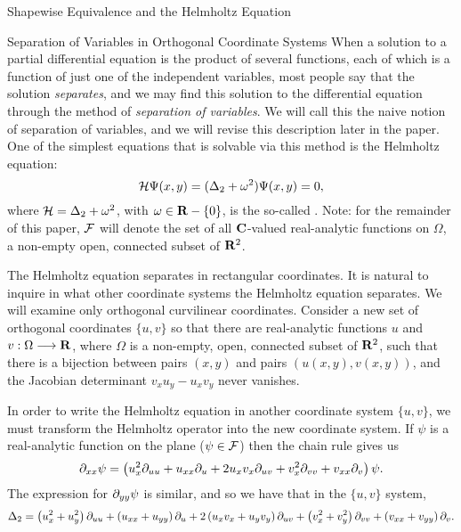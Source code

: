 \begin{center}
\LARGE Shapewise Equivalence and the Helmholtz Equation \

\end{center}

\normalsize

\begin{section}{Separation of Variables in Orthogonal Coordinate Systems}
When a solution to a partial differential equation is the product of several functions, each of which is a function of just one of the independent variables, most people say that the solution \emph{separates}, and we may find this solution to the differential equation through the method of \emph{separation of variables}.  We will call this the naive notion of separation of variables, and we will revise this description later in the paper.  One of the simplest equations that is solvable via this method is the Helmholtz equation:
\begin{equation}
\label{helmholtz}
\mathcal{H} \Psi(x, y) = (\Delta_2 + \omega^2)\Psi(x, y) = 0,
\end{equation}
where $\mathcal{H} = \Delta_2 + \omega^2$, with $\omega \in \mathbf{R} - \{ 0 \}$, is the so-called .  Note: for the remainder of this paper, $\mathcal{F}$ will denote the set of all $\mathbf{C}$-valued real-analytic functions on $\Omega$, a non-empty open, connected subset of $\mathbf{R}^2$.

The Helmholtz equation separates in rectangular coordinates.  It is natural to inquire in what other coordinate systems the Helmholtz equation separates.  We will examine only orthogonal curvilinear coordinates.  Consider a new set of orthogonal coordinates $\{ u,v \}$ so that  there are real-analytic functions $u$ and $v: \Omega \longrightarrow \mathbf{R}$, where $\Omega$ is a non-empty, open, connected subset of $\mathbf{R}^2$, such that there is a bijection between pairs $(x,y)$ and pairs $(u(x,y), v(x,y))$, and  the Jacobian determinant $v_x u_y - u_x v_y$ never vanishes.

In order to write the Helmholtz equation in another coordinate system $\{ u, v \}$, we must transform the Helmholtz operator into the new coordinate system.  If $\psi$ is a real-analytic function on the plane ($\psi \in \mathcal{F}$) then the chain rule gives us
\[
\partial_{x x} \psi	=	\left( u_x^2 \partial_{u u} + u_{xx} \partial_{u} + 2 u_x v_x \partial_{u v} + v_x^2 \partial_{v v} + v_{xx} \partial_{v} \right) \psi .
\]
The expression for $\partial_{y y} \psi$ is similar, and so we have that in the $\{ u,v \}$ system,
\begin{equation}
\label{laplaciantrans}
\Delta_2 = \left( u_x^2 + u_y^2 \right) \partial_{u u} + \left( u_{xx} + u_{yy} \right) \partial_{u} + 2\left( u_x v_x + u_y v_y \right) \partial_{u v} + \left( v_x^2 + v_y^2 \right) \partial_{v v} + \left( v_{xx} + v_{yy} \right) \partial_{v} .
\end{equation}


\end{section}
